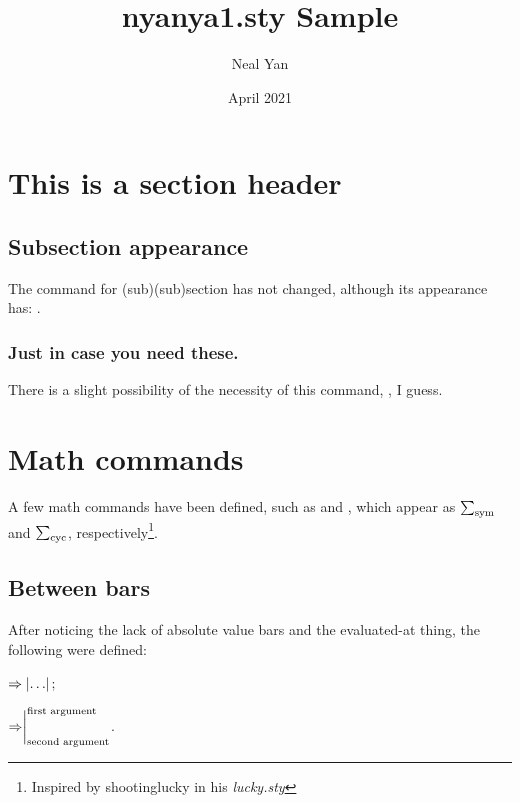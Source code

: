 \documentclass{article}
\title{nyanya1.sty Sample}
\author{Neal Yan}
\date{April 2021}
\begin{document}
\maketitle



\section{This is a section header}
\subsection{Subsection appearance}

The command for (sub)(sub)section has not changed, although its appearance has: .

\subsubsection{Just in case you need these.}

There is a slight possibility of the necessity of this command, , I guess.

\section{Math commands}

A few math commands have been defined, such as  and , which appear as $\sym$ and $\cyc$, respectively\footnote{Inspired by shootinglucky in his \emph{lucky.sty}}.

\subsection{Between bars}

After noticing the lack of absolute value bars and the evaluated-at thing, the following were defined: 

$\Rightarrow\abs{\dots}$;

$\Rightarrow\evalat[\text{first argument}]{\text{second argument}}$.
\end{document}

